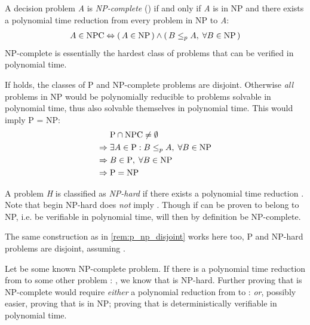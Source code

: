\begin{definition}\label{def:np_complete}
	A decision problem \emph{A} is \emph{NP-complete} () if and only if \emph{A} is in NP and there exists a polynomial time reduction from every problem in NP to \emph{A}:
	\begin{align*}
		A \in \text{NPC} \Leftrightarrow (\, A \in \text{NP} \,) \land (\, B \leq_p A, \; \forall B \in \text{NP} \,)
	\end{align*}
	NP-complete is essentially the hardest class of problems that can be verified in polynomial time. 
\end{definition}

\begin{remark}\label{rem:p_np_disjoint}
	If \ilmath{\pclass \neq \NP} holds, the classes of P and NP-complete problems are disjoint. Otherwise \emph{all} problems in NP would be polynomially reducible to problems solvable in polynomial time, thus also solvable themselves in polynomial time. This would imply P = NP:
	\begin{align*}
		& \text{P} \cap \text{NPC} \neq \emptyset \\
		\Rightarrow \; & \exists A \in \text{P} : B \leq_p A, \; \forall B \in \text{NP} \\
		\Rightarrow \; & B \in \text{P}, \; \forall B \in \text{NP} \\
		\Rightarrow \; & \text{P} = \text{NP}
	\end{align*}
\end{remark}

\begin{definition}\label{def:np_hard}
	A problem \emph{H} is classified as \emph{NP-hard} if there exists a polynomial time reduction . Note that  begin NP-hard does \emph{not} imply . Though if  can be proven to belong to NP, i.e. be verifiable in polynomial time,  will then by definition be NP-complete.
\end{definition}

\begin{remark}\label{rem:p_np_hard_disjoint}
	The same construction as in \cref{rem:p_np_disjoint} works here too, P and NP-hard problems are disjoint, assuming \ilmath{\pclass \neq \NP}.
\end{remark}

\begin{remark}\label{note:npc_proving}
	Let  be some known NP-complete problem. If there is a polynomial time reduction from  to some other problem : , we know that  is NP-hard. Further proving that  is NP-complete would require \emph{either} a polynomial reduction from  to :  \emph{or}, possibly easier, proving that  is in NP;  proving that  is deterministically verifiable in polynomial time.
\end{remark}

